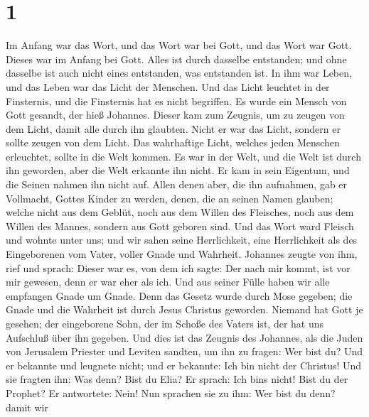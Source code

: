 \hypertarget{section}{%
\section{1}\label{section}}

 Im Anfang war das Wort, und das Wort war bei Gott, und
das Wort war Gott.  Dieses war im Anfang bei Gott.
 Alles ist durch dasselbe entstanden; und ohne dasselbe
ist auch nicht eines entstanden, was entstanden ist.  In
ihm war Leben, und das Leben war das Licht der Menschen. 
Und das Licht leuchtet in der Finsternis, und die Finsternis hat es
nicht begriffen.  Es wurde ein Mensch von Gott gesandt,
der hieß Johannes.  Dieser kam zum Zeugnis, um zu zeugen
von dem Licht, damit alle durch ihn glaubten.  Nicht er
war das Licht, sondern er sollte zeugen von dem Licht. 
Das wahrhaftige Licht, welches jeden Menschen erleuchtet, sollte in die
Welt kommen.  Es war in der Welt, und die Welt ist durch
ihn geworden, aber die Welt erkannte ihn nicht.  Er kam
in sein Eigentum, und die Seinen nahmen ihn nicht auf. 
Allen denen aber, die ihn aufnahmen, gab er Vollmacht, Gottes Kinder zu
werden, denen, die an seinen Namen glauben;  welche nicht
aus dem Geblüt, noch aus dem Willen des Fleisches, noch aus dem Willen
des Mannes, sondern aus Gott geboren sind.  Und das Wort
ward Fleisch und wohnte unter uns; und wir sahen seine Herrlichkeit,
eine Herrlichkeit als des Eingeborenen vom Vater, voller Gnade und
Wahrheit.  Johannes zeugte von ihm, rief und sprach:
Dieser war es, von dem ich sagte: Der nach mir kommt, ist vor mir
gewesen, denn er war eher als ich.  Und aus seiner Fülle
haben wir alle empfangen Gnade um Gnade.  Denn das Gesetz
wurde durch Mose gegeben; die Gnade und die Wahrheit ist durch Jesus
Christus geworden.  Niemand hat Gott je gesehen; der
eingeborene Sohn, der im Schoße des Vaters ist, der hat uns Aufschluß
über ihn gegeben.  Und dies ist das Zeugnis des Johannes,
als die Juden von Jerusalem Priester und Leviten sandten, um ihn zu
fragen: Wer bist du?  Und er bekannte und leugnete nicht;
und er bekannte: Ich bin nicht der Christus!  Und sie
fragten ihn: Was denn? Bist du Elia? Er sprach: Ich
bin\textquotesingle s nicht! Bist du der Prophet? Er antwortete: Nein!
 Nun sprachen sie zu ihm: Wer bist du denn? damit wir
